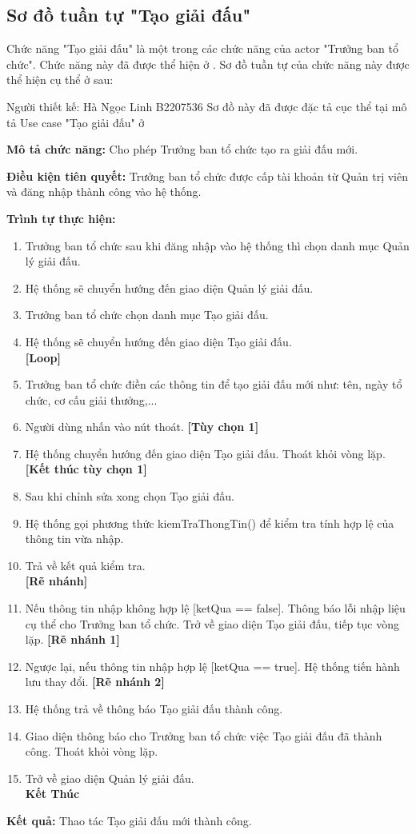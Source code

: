 \subsection{Sơ đồ tuần tự "Tạo giải đấu"}
\setcounter{figure}{0}

Chức năng "Tạo giải đấu" là một trong các chức năng của actor "Trưởng ban tổ chức". Chức năng này đã được thể hiện ở \myref{}. Sơ đồ tuần tự của chức năng này được thể hiện cụ thể ở \myref{} sau:

Người thiết kế: Hà Ngọc Linh B2207536
Sơ đồ này đã được đặc tả cục thể tại mô tả Use case "Tạo giải đấu" ở \myreftb{}

\noindent
\textbf{Mô tả chức năng:} Cho phép Trưởng ban tổ chức tạo ra giải đấu mới.

\noindent
\textbf{Điều kiện tiên quyết:} Trưởng ban tổ chức được cấp tài khoản từ Quản trị viên và đăng nhập thành công vào hệ thống.

\noindent
\textbf{Trình tự thực hiện:}
\begin{enumerate}
      \item Trưởng ban tổ chức sau khi đăng nhập vào hệ thống thì chọn danh mục Quản lý giải đấu.
      \item Hệ thống sẽ chuyển hướng đến giao diện Quản lý giải đấu.
      \item Trưởng ban tổ chức chọn danh mục Tạo giải đấu.
      \item Hệ thống sẽ chuyển hướng đến giao diện Tạo giải đấu.\\
            \textbf{[Loop]}
      \item    Trưởng ban tổ chức điền các thông tin để tạo giải đấu mới như: tên, ngày tổ chức, cơ cấu giải thưởng,...
      \item Người dùng nhấn vào nút thoát. \textbf{[Tùy chọn 1]}
      \item Hệ thống chuyển hướng đến giao diện Tạo giải đấu. Thoát khỏi vòng lặp. \\
            \textbf{[Kết thúc tùy chọn 1]}
      \item Sau khi chỉnh sửa xong chọn Tạo giải đấu.
      \item Hệ thống gọi phương thức kiemTraThongTin() để kiểm tra tính hợp lệ của thông tin vừa nhập.
      \item Trả về kết quả kiểm tra. \\
            \textbf{[Rẽ nhánh]}
      \item Nếu thông tin nhập không hợp lệ [ketQua == false]. Thông báo lỗi nhập liệu cụ thể cho Trưởng ban tổ chức. Trở về giao diện Tạo giải đấu, tiếp tục vòng lặp. \textbf{[Rẽ nhánh 1]}
      \item Ngược lại, nếu thông tin nhập hợp lệ [ketQua == true]. Hệ thống tiến hành lưu thay đổi. \textbf{[Rẽ nhánh 2]}
      \item Hệ thống trả về thông báo Tạo giải đấu thành công.
      \item Giao diện thông báo cho Trưởng ban tổ chức việc Tạo giải đấu đã thành công. Thoát khỏi vòng lặp.
      \item Trở về giao diện Quản lý giải đấu. \\
            \textbf{Kết Thúc}
\end{enumerate}

\noindent
\textbf{Kết quả:} Thao tác Tạo giải đấu mới thành công.

